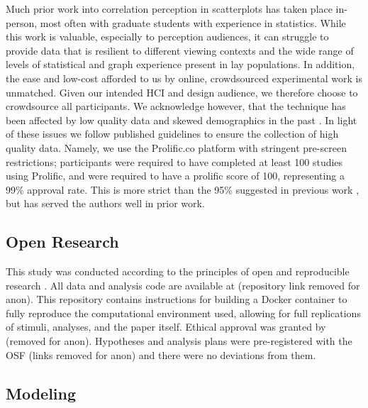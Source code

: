 \documentclass[manuscript, review, anonymous, screen]{acmart}
\begin{document}
Much prior work into correlation perception in scatterplots has taken
place in-person, most often with graduate students with experience in
statistics. While this work is valuable, especially to perception
audiences, it can struggle to provide data that is resilient to
different viewing contexts and the wide range of levels of statistical
and graph experience present in lay populations. In addition, the ease
and low-cost afforded to us by online, crowdsourced experimental work is
unmatched. Given our intended HCI and design audience, we therefore
choose to crowdsource all participants. We acknowledge however, that the
technique has been affected by low quality data and skewed demographics
in the past \citep{chmielewski_2020, charalambides_2021, peer_2021}. In
light of these issues we follow published guidelines \citep{peer_2021}
to ensure the collection of high quality data. Namely, we use the
Prolific.co platform \citep{prolific} with stringent pre-screen
restrictions; participants were required to have completed at least 100
studies using Prolific, and were required to have a prolific score of
100, representing a 99\% approval rate. This is more strict than the
95\% suggested in previous work \citep{peer_2021}, but has served the
authors well in prior work.

\hypertarget{sec-open-research}{%
\subsection{Open Research}\label{sec-open-research}}

This study was conducted according to the principles of open and
reproducible research \citep{ayris_2018}. All data and analysis code are
available at (repository link removed for anon). This repository
contains instructions for building a Docker container to fully reproduce
the computational environment used, allowing for full replications of
stimuli, analyses, and the paper itself. Ethical approval was granted by
(removed for anon). Hypotheses and analysis plans were pre-registered
with the OSF (links removed for anon) and there were no deviations from
them.

\hypertarget{sec-gen-modelling}{%
\subsection{Modeling}\label{sec-gen-modelling}}
\end{document}
